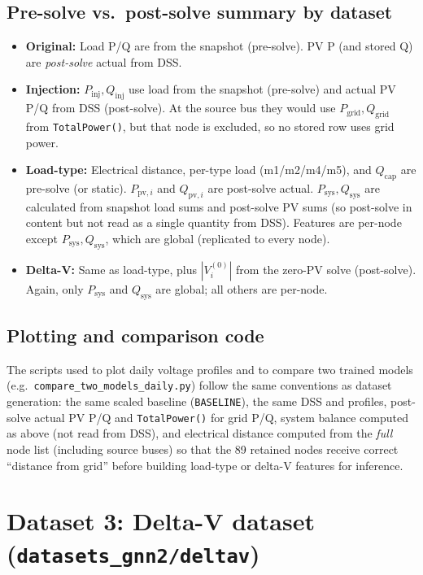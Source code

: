 \documentclass[11pt]{article}
\begin{document}
\subsection*{Pre-solve vs.\ post-solve summary by dataset}

\begin{itemize}[noitemsep]
\item \textbf{Original:} Load P/Q are from the snapshot (pre-solve). PV P (and stored Q) are \emph{post-solve} actual from DSS.
\item \textbf{Injection:} $P_{\mathrm{inj}},Q_{\mathrm{inj}}$ use load from the snapshot (pre-solve) and actual PV P/Q from DSS (post-solve). At the source bus they would use $P_{\mathrm{grid}},Q_{\mathrm{grid}}$ from \texttt{TotalPower()}, but that node is excluded, so no stored row uses grid power.
\item \textbf{Load-type:} Electrical distance, per-type load (m1/m2/m4/m5), and $Q_{\mathrm{cap}}$ are pre-solve (or static). $P_{\mathrm{pv},i}$ and $Q_{\mathrm{pv},i}$ are post-solve actual. $P_{\mathrm{sys}},Q_{\mathrm{sys}}$ are calculated from snapshot load sums and post-solve PV sums (so post-solve in content but not read as a single quantity from DSS). Features are per-node except $P_{\mathrm{sys}},Q_{\mathrm{sys}}$, which are global (replicated to every node).
\item \textbf{Delta-V:} Same as load-type, plus $|V_i^{(0)}|$ from the zero-PV solve (post-solve). Again, only $P_{\mathrm{sys}}$ and $Q_{\mathrm{sys}}$ are global; all others are per-node.
\end{itemize}

\subsection*{Plotting and comparison code}

The scripts used to plot daily voltage profiles and to compare two trained models (e.g.\ \texttt{compare\_two\_models\_daily.py}) follow the same conventions as dataset generation: the same scaled baseline (\texttt{BASELINE}), the same DSS and profiles, post-solve actual PV P/Q and \texttt{TotalPower()} for grid P/Q, system balance computed as above (not read from DSS), and electrical distance computed from the \emph{full} node list (including source buses) so that the 89 retained nodes receive correct ``distance from grid'' before building load-type or delta-V features for inference.

\section{Dataset 3: Delta-V dataset (\texttt{datasets\_gnn2/deltav})}
\end{document}
